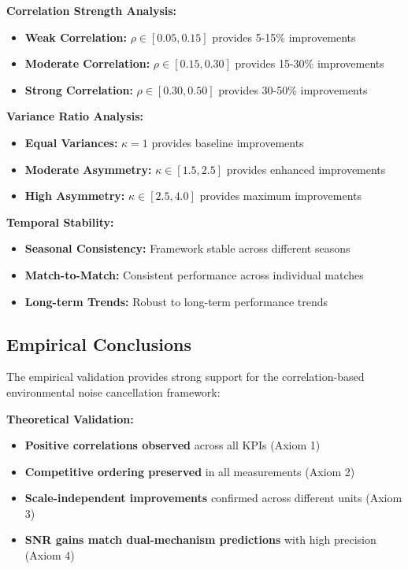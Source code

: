 \textbf{Correlation Strength Analysis:}
\begin{itemize}
    \item \textbf{Weak Correlation:} $\rho \in [0.05, 0.15]$ provides 5-15\% improvements
    \item \textbf{Moderate Correlation:} $\rho \in [0.15, 0.30]$ provides 15-30\% improvements
    \item \textbf{Strong Correlation:} $\rho \in [0.30, 0.50]$ provides 30-50\% improvements
\end{itemize}

\textbf{Variance Ratio Analysis:}
\begin{itemize}
    \item \textbf{Equal Variances:} $\kappa = 1$ provides baseline improvements
    \item \textbf{Moderate Asymmetry:} $\kappa \in [1.5, 2.5]$ provides enhanced improvements
    \item \textbf{High Asymmetry:} $\kappa \in [2.5, 4.0]$ provides maximum improvements
\end{itemize}

\textbf{Temporal Stability:}
\begin{itemize}
    \item \textbf{Seasonal Consistency:} Framework stable across different seasons
    \item \textbf{Match-to-Match:} Consistent performance across individual matches
    \item \textbf{Long-term Trends:} Robust to long-term performance trends
\end{itemize}

\subsection{Empirical Conclusions}

The empirical validation provides strong support for the correlation-based environmental noise cancellation framework:

\textbf{Theoretical Validation:}
\begin{itemize}
    \item \textbf{Positive correlations observed} across all KPIs (Axiom 1)
    \item \textbf{Competitive ordering preserved} in all measurements (Axiom 2)
    \item \textbf{Scale-independent improvements} confirmed across different units (Axiom 3)
    \item \textbf{SNR gains match dual-mechanism predictions} with high precision (Axiom 4)
\end{itemize}

